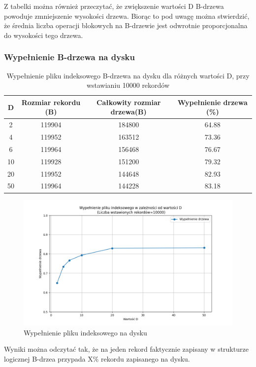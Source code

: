 \documentclass[12pt]{article}
\begin{document}
Z tabelki można również przeczytać, że zwiększenie wartości D B-drzewa 
powoduje zmniejszenie wysokości drzewa.
Biorąc to pod uwagę można stwierdzić, że średnia liczba operacji blokowych na B-drzewie
jest odwrotnie proporcjonalna do wysokości tego drzewa.

\subsubsection{Wypełnienie B-drzewa na dysku}

\begin{table}[H]
\centering
\caption{Wypełnienie pliku indeksowego B-drzewa na dysku dla różnych wartości D, przy wstawianiu 10000 rekordów}
\begin{tabular}{|c|c|c|c|}
\hline
D & Rozmiar rekordu (B) & Całkowity rozmiar drzewa(B) & Wypełnienie drzewa (\%) \\
\hline
2 & 119904 & 184800 & 64.88 \\
4 & 119952 & 163512 & 73.36 \\
6 & 119964 & 156468 & 76.67 \\
10 & 119928 & 151200 & 79.32 \\
20 & 119952 & 144648 & 82.93 \\
50 & 119964 & 144228 & 83.18 \\
\hline
\end{tabular}
\end{table}

\begin{figure}[H]
    \centering
    \includegraphics[width=\textwidth]{../Plots/tree_fill.png}
    \caption{Wypełnienie pliku indeksowego na dysku}
    \label{fig:plot2}
\end{figure}

Wyniki można odczytać tak, że na jeden rekord faktycznie zapisany w strukturze logicznej
B-drzea przypada X\% rekordu zapisanego na dysku.
\end{document}
